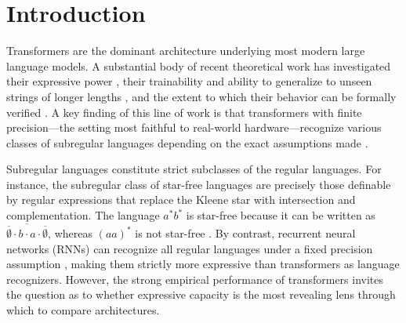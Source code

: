 \documentclass{article} %
\begin{document}
\section{Introduction}
\label{sec:intro}
Transformers \citep{Vaswani17} are the dominant architecture underlying
most modern large language models. 
A substantial body of recent
theoretical work has investigated their expressive power
\citep{transformers_survey,barcelo2024logical,YangCA24,hahn20,perez,CC22,tale},
their trainability and ability to generalize to unseen strings of longer lengths
\citep{raspl,framework,CC22}, and the extent to which their behavior can
be formally verified \citep{SAL25}. A key finding of this line of work is
that transformers with finite precision---the setting most
faithful to real-world hardware---recognize various classes of subregular languages depending on the exact assumptions made \citep{YangCA24,barcelo2024logical,tale,LC25}.

Subregular languages constitute strict subclasses of the regular languages.
For instance, the subregular class of star-free languages are precisely those definable by regular expressions that replace the
Kleene star with intersection and complementation. 
The language $a^*b^*$
is star-free because it can be written as
$\overline{\overline{\emptyset} \cdot b \cdot a \cdot\overline{\emptyset}}$, whereas $(aa)^*$ is not star-free \citep{straubing-book}. 
By contrast, recurrent
neural networks (RNNs) can recognize all regular languages under a fixed precision assumption
\citep{minsky1967computation,SS95,RNN-hierarchy,svete2023recurrent}, making them strictly more expressive than
transformers as language recognizers. 
However, the strong empirical performance of transformers invites the question as to whether expressive capacity is the most revealing lens through which to compare architectures.
\end{document}
